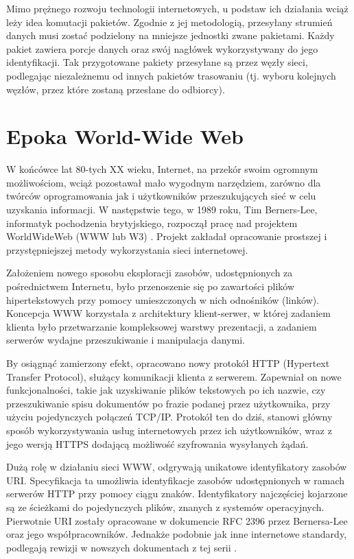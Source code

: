 Mimo prężnego rozwoju technologii internetowych, u podstaw ich działania wciąż leży idea komutacji pakietów. Zgodnie z jej metodologią, przesyłany strumień danych musi zostać podzielony na mniejsze jednostki zwane pakietami. Każdy pakiet zawiera porcje danych oraz swój nagłówek wykorzystywany do jego identyfikacji. Tak przygotowane pakiety przesyłane są przez węzły sieci, podlegając niezależnemu od innych pakietów trasowaniu (tj. wyboru kolejnych węzłów, przez które zostaną przesłane do odbiorcy).

\section{Epoka World-Wide Web}

W końcówce lat 80-tych XX wieku, Internet, na przekór swoim ogromnym możliwościom, wciąż pozostawał mało wygodnym narzędziem, zarówno dla twórców oprogramowania jak i użytkowników przeszukujących sieć w celu uzyskania informacji. W następstwie tego, w 1989 roku, Tim Berners-Lee, informatyk pochodzenia brytyjskiego, rozpoczął pracę nad projektem WorldWideWeb (WWW lub W3) \cite{Berners-Lee.world-wide-web}. Projekt zakładał opracowanie prostszej i przystępniejszej metody wykorzystania sieci internetowej.

Założeniem nowego sposobu eksploracji zasobów, udostępnionych za pośrednictwem Internetu, było przenoszenie się po zawartości plików hipertekstowych przy pomocy umieszczonych w nich odnośników (linków). Koncepcja WWW korzystała z architektury klient-serwer, w której zadaniem klienta było przetwarzanie kompleksowej warstwy prezentacji, a zadaniem serwerów wydajne przeszukiwanie i manipulacja danymi.

By osiągnąć zamierzony efekt, opracowano nowy protokół HTTP (Hypertext Transfer Protocol), służący komunikacji klienta z serwerem. Zapewniał on nowe funkcjonalności, takie jak uzyskiwanie plików tekstowych po ich nazwie, czy przeszukiwanie spisu dokumentów po frazie podanej przez użytkownika, przy użyciu pojedynczych połączeń TCP/IP. Protokół ten do dziś, stanowi główny sposób wykorzystywania usług internetowych przez ich użytkowników, wraz z jego wersją HTTPS dodającą możliwość szyfrowania wysyłanych żądań. 

Dużą rolę w działaniu sieci WWW, odgrywają unikatowe identyfikatory zasobów URI. Specyfikacja ta umożliwia identyfikacje zasobów udostępnionych w ramach serwerów HTTP przy pomocy ciągu znaków. Identyfikatory najczęściej kojarzone są ze ścieżkami do pojedynczych plików, znanych z systemów operacyjnych. Pierwotnie URI zostały opracowane w dokumencie RFC 2396 przez Bernersa-Lee oraz jego współpracowników. Jednakże podobnie jak inne internetowe standardy, podlegają rewizji w nowszych dokumentach z tej serii \cite{rfc.2396.URI}.

